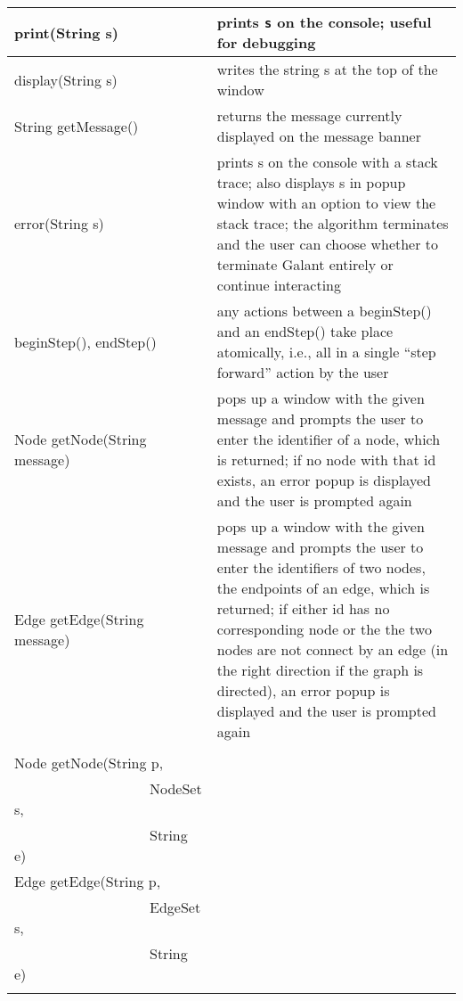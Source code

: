 \begin{table}
  \small
  \centering
  \begin{tabular}{| m{} | m{} |}
    \hline
    \textsf{print(String s)}
    &
    prints \texttt{s} on the console; useful for debugging
    \\ \hline
    \textsf{display(String s)}
    &
    writes the string \textsf{s} at the top of the window
    \\ \hline
    \textsf{String getMessage()}
    &
    returns the message currently displayed on the message banner
    \\ \hline
    \textsf{error(String s)}
    &
    prints \textsf{s} on the console with a stack trace; also displays
    \textsf{s} in popup window with an option to view the stack trace;
    the algorithm terminates and the user can choose whether to terminate
    Galant entirely or continue interacting
    \\ \hline
    \textsf{beginStep()},
    \textsf{endStep()}
    &
    any actions between a \textsf{beginStep()} and an \textsf{endStep()}
    take place atomically, i.e.,
    all in a single ``step forward'' action by the user
    \\ \hline
    \textsf{Node getNode(String message)}
    &
    pops up a window with the given message and prompts the user to enter the
    identifier of a node, which is returned;
    if no node with that id exists,
    an error popup is displayed and the user is prompted again
    \\ \hline
    \textsf{Edge getEdge(String message)}
    &
    pops up a window with the given message and prompts the user to enter the
    identifiers of two nodes, the endpoints of an edge, which is returned;
    if either id has no corresponding node or the the two nodes are not connect
    by an edge (in the right direction if the graph is directed),
    an error popup is displayed and the user is prompted again
    \\ \hline
    \shortstack[l] {
      \mbox{}
      \\[\smallskipamount]
      \textsf{Node getNode(String p,} \\
      \textsf{~~~~~~~~~~~~~~~~~~~NodeSet s,} \\
      \textsf{~~~~~~~~~~~~~~~~~~~String e)} \\
      \textsf{Edge getEdge(String p,} \\
      \textsf{~~~~~~~~~~~~~~~~~~~EdgeSet s,} \\
      \textsf{~~~~~~~~~~~~~~~~~~~String e)} \\
}
\end{tabular}
\end{table}
